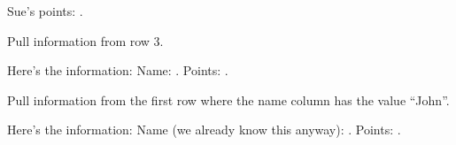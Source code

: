 \documentclass{memoir}
\begin{document}
Sue's points: .

Pull information from row 3.

Here's the information: Name: \name. Points: \points.

Pull information from the first row where the name column has the
value ``John''.

Here's the information: Name (we already know this anyway): \name.
Points: \points.
\end{document}

